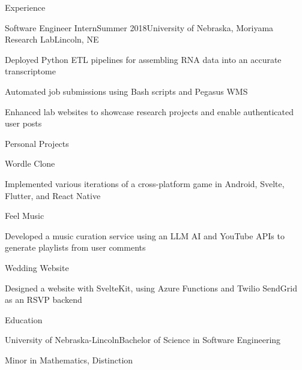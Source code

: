 \documentclass[
	10pt, %
]{article} %
\begin{document}
\begin{rSection}{Experience}
	\begin{rSubsection}{Software Engineer Intern}{Summer 2018}{University of Nebraska, Moriyama Research Lab}{Lincoln, NE}
		\item Deployed Python ETL pipelines for assembling RNA data into an accurate transcriptome
		\item Automated job submissions using Bash scripts and Pegasus WMS
		\item Enhanced lab websites to showcase research projects and enable authenticated user posts
	\end{rSubsection}

\end{rSection}

\begin{rSection}{Personal Projects}

	\begin{rSubsection}{Wordle Clone}{}{}{}
		\item Implemented various iterations of a cross-platform game in Android, Svelte, Flutter, and React Native
	\end{rSubsection}

	\begin{rSubsection}{Feel Music}{}{}{}
		\item Developed a music curation service using an LLM AI and YouTube APIs to generate playlists from user comments
	\end{rSubsection}

	\begin{rSubsection}{Wedding Website}{}{}{}
		\item Designed a website with SvelteKit, using Azure Functions and Twilio SendGrid as an RSVP backend
	\end{rSubsection}

\end{rSection}

\begin{rSection}{Education}
	\begin{rSubsection}{University of Nebraska-Lincoln}{}{Bachelor of Science in Software Engineering}{}
		\item[] Minor in Mathematics, Distinction
	\end{rSubsection}
\end{rSection}
\end{document}
